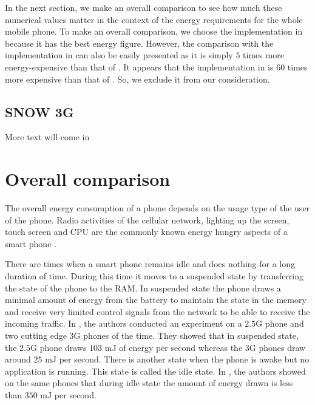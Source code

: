 In the next section, we make an overall comparison to see how much these numerical values matter in the context of the energy requirements for the whole mobile phone. To make an overall comparison, we choose the implementation in \cite{Ruhr_2011} because it has the best energy figure. However, the comparison with the implementation in \cite{Ruhr_2009} can also be easily presented as it is simply $5$ times more energy-expensive than that of \cite{Ruhr_2011}. It appears that the implementation in \cite{Pune_2012} is $60$ times more expensive than that of \cite{Ruhr_2011}. So, we exclude it from our consideration. 

\subsection{SNOW 3G}
\label{sub-sec:snow3gp}
More text will come in

\section{Overall comparison}
\label{sec:overall_comparison}
The overall energy consumption of a phone depends on the usage type of the user of the phone. Radio activities of the cellular network, lighting up the screen, touch screen and CPU are the commonly known energy hungry aspects of a smart phone \cite{Usenix_2010}. 

There are times when a smart phone remains idle and does nothing for a long duration of time. During this time it moves to a suspended state by transferring the state of the phone to the RAM. In suspended state the phone draws a minimal amount of energy from the battery to maintain the state in the memory and receive very limited control signals from the network to be able to receive the incoming traffic. In \cite{Usenix_2010}, the authors conducted an experiment on a $2.5$G phone and two cutting edge $3$G phones of the time. They showed that in suspended state, the $2.5$G phone draws $103$ mJ of energy per second whereas the 3G phones draw around $25$ mJ per second. There is another state when the phone is awake but no application is running. This state is called the idle state. In \cite{Usenix_2010}, the authors showed on the same phones that during idle state the amount of energy drawn is less than $350$ mJ per second. 

